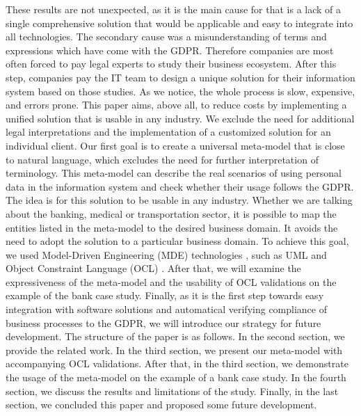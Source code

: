 \documentclass[11pt,english]{article}
\begin{document}
\newline These results are not unexpected, as it is the main cause for that is a lack of a single comprehensive solution that would be applicable and easy to integrate into all technologies. The secondary cause was a misunderstanding of terms and expressions which have come with the GDPR. Therefore companies are most often forced to pay legal experts to study their business ecosystem. After this step, companies pay the IT team to design a unique solution for their information system based on those studies. As we notice, the whole process is slow, expensive, and errors prone. \newline This paper aims, above all, to reduce costs by implementing a unified solution that is usable in any industry. We exclude the need for additional legal interpretations and the implementation of a customized solution for an individual client. Our first goal is to create a universal meta-model that is close to natural language, which excludes the need for further interpretation of terminology. This meta-model can describe the real scenarios of using personal data in the information system and check whether their usage follows the GDPR. The idea is for this solution to be usable in any industry. Whether we are talking about the banking, medical or transportation sector, it is possible to map the entities listed in the meta-model to the desired business domain. It avoids the need to adopt the solution to a particular business domain. To achieve this goal, we used Model-Driven Engineering (MDE) technologies \cite{mde}, such as UML \cite{uml} and Object Constraint Language (OCL) \cite{ocl}. After that, we will examine the expressiveness of the meta-model and the usability of OCL validations on the example of the bank case study. Finally, as it is the first step towards easy integration with software solutions and automatical verifying compliance of business processes to the GDPR, we will introduce our strategy for future development. \newline The structure of the paper is as follows. In the second section, we provide the related work. In the third section, we present our meta-model with accompanying OCL validations. After that, in the third section, we demonstrate the usage of the meta-model on the example of a bank case study. In the fourth section, we discuss the results and limitations of the study. Finally, in the last section, we concluded this paper and proposed some future development.
\end{document}

